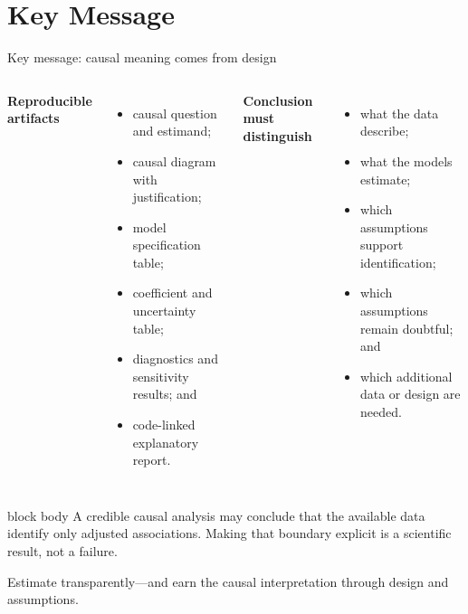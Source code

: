 \documentclass[10pt,aspectratio=169]{beamer}
\begin{document}
\section{Key Message}

\begin{frame}{Key message: causal meaning comes from design}

\small

\begin{columns}[T]


\textbf{Reproducible artifacts}

\begin{itemize}
  \item causal question and estimand;
  \item causal diagram with justification;
  \item model specification table;
  \item coefficient and uncertainty table;
  \item diagnostics and sensitivity results; and
  \item code-linked explanatory report.
\end{itemize}


\textbf{Conclusion must distinguish}

\begin{itemize}
  \item what the data describe;
  \item what the models estimate;
  \item which assumptions support identification;
  \item which assumptions remain doubtful; and
  \item which additional data or design are needed.
\end{itemize}

\end{columns}

\vspace{0.30cm}

\begin{beamercolorbox}[rounded=true,sep=8pt]{block body}
A credible causal analysis may conclude that the available data identify only adjusted associations. Making that boundary explicit is a scientific result, not a failure.
\end{beamercolorbox}

\vspace{0.15cm}

\centering
\textcolor{ukudlaRed}{Estimate transparently---and earn the causal interpretation through design and assumptions.}

\end{frame}
\end{document}
